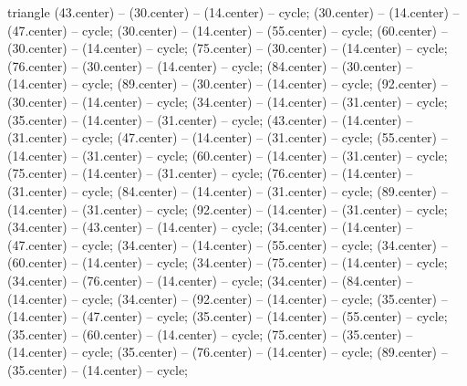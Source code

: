 \begin{pgfonlayer}{triangle}
 (43.center) -- (30.center) -- (14.center) -- cycle; 
 (30.center) -- (14.center) -- (47.center) -- cycle; 
 (30.center) -- (14.center) -- (55.center) -- cycle; 
 (60.center) -- (30.center) -- (14.center) -- cycle; 
 (75.center) -- (30.center) -- (14.center) -- cycle; 
 (76.center) -- (30.center) -- (14.center) -- cycle; 
 (84.center) -- (30.center) -- (14.center) -- cycle; 
 (89.center) -- (30.center) -- (14.center) -- cycle; 
 (92.center) -- (30.center) -- (14.center) -- cycle; 
 (34.center) -- (14.center) -- (31.center) -- cycle; 
 (35.center) -- (14.center) -- (31.center) -- cycle; 
 (43.center) -- (14.center) -- (31.center) -- cycle; 
 (47.center) -- (14.center) -- (31.center) -- cycle; 
 (55.center) -- (14.center) -- (31.center) -- cycle; 
 (60.center) -- (14.center) -- (31.center) -- cycle; 
 (75.center) -- (14.center) -- (31.center) -- cycle; 
 (76.center) -- (14.center) -- (31.center) -- cycle; 
 (84.center) -- (14.center) -- (31.center) -- cycle; 
 (89.center) -- (14.center) -- (31.center) -- cycle; 
 (92.center) -- (14.center) -- (31.center) -- cycle; 
 (34.center) -- (43.center) -- (14.center) -- cycle; 
 (34.center) -- (14.center) -- (47.center) -- cycle; 
 (34.center) -- (14.center) -- (55.center) -- cycle; 
 (34.center) -- (60.center) -- (14.center) -- cycle; 
 (34.center) -- (75.center) -- (14.center) -- cycle; 
 (34.center) -- (76.center) -- (14.center) -- cycle; 
 (34.center) -- (84.center) -- (14.center) -- cycle; 
 (34.center) -- (92.center) -- (14.center) -- cycle; 
 (35.center) -- (14.center) -- (47.center) -- cycle; 
 (35.center) -- (14.center) -- (55.center) -- cycle; 
 (35.center) -- (60.center) -- (14.center) -- cycle; 
 (75.center) -- (35.center) -- (14.center) -- cycle; 
 (35.center) -- (76.center) -- (14.center) -- cycle; 
 (89.center) -- (35.center) -- (14.center) -- cycle; 

\end{pgfonlayer}
